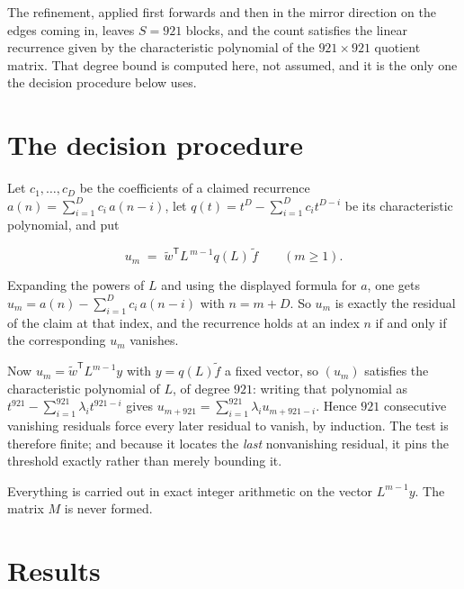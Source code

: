 \documentclass[11pt]{article}
\theoremstyle{definition}
\begin{document}
The refinement, applied first forwards and then in the mirror direction on the edges coming in, leaves $S = 921$ blocks, and the count satisfies the linear recurrence given by the characteristic polynomial of the $921 \times 921$ quotient matrix. That degree bound is computed here, not assumed, and it is the only one the decision procedure below uses.

\section{The decision procedure}

Let $c_1,\dots,c_D$ be the coefficients of a claimed recurrence $a(n) = \sum_{i=1}^{D} c_i\,a(n-i)$, let $q(t) = t^{D} - \sum_{i=1}^{D} c_i t^{D-i}$ be its characteristic polynomial, and put

\[u_m \;=\; \tilde w^{\mathsf T} L^{\,m-1} q(L)\,\tilde f \qquad (m \ge 1).\]

Expanding the powers of $L$ and using the displayed formula for $a$, one gets $u_m = a(n) - \sum_{i=1}^{D} c_i\,a(n-i)$ with $n = m + D$. So $u_m$ is exactly the residual of the claim at that index, and the recurrence holds at an index $n$ if and only if the corresponding $u_m$ vanishes.

Now $u_m = \tilde w^{\mathsf T} L^{m-1} y$ with $y = q(L)\tilde f$ a fixed vector, so $(u_m)$ satisfies the characteristic polynomial of $L$, of degree $921$: writing that polynomial as $t^{921} - \sum_{i=1}^{921} \lambda_i t^{921-i}$ gives $u_{m+921} = \sum_{i=1}^{921} \lambda_i u_{m+921-i}$. Hence $921$ consecutive vanishing residuals force every later residual to vanish, by induction. The test is therefore finite; and because it locates the {\itshape last} nonvanishing residual, it pins the threshold exactly rather than merely bounding it.

Everything is carried out in exact integer arithmetic on the vector $L^{m-1}y$. The matrix $M$ is never formed.

\section{Results}
\end{document}
